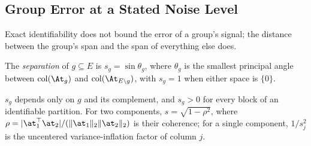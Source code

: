 
\subsection{Group Error at a Stated Noise Level}
\label{subsec:group_error}

Exact identifiability does not bound the error of a group's signal; the distance
between the group's span and the span of everything else does.

\begin{definition}[Separation]
\label{def:separation}
The \emph{separation} of \(g\subseteq E\) is \(s_g=\sin\theta_g\), where
\(\theta_g\) is the smallest principal angle \citep{bjorck1973numerical} between
\(\operatorname{col}(\At_g)\) and \(\operatorname{col}(\At_{E\setminus g})\), with
\(s_g=1\) when either space is \(\{0\}\).
\end{definition}

\(s_g\) depends only on \(g\) and its complement, and \(s_g>0\) for every block of an
identifiable partition.  For two components, \(s=\sqrt{1-\rho^2}\), where
\(\rho=|\at_1^\top\at_2|/(\|\at_1\|_2\|\at_2\|_2)\) is their coherence; for a single
component, \(1/s_j^2\) is the uncentered variance-inflation factor of column \(j\).

